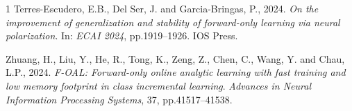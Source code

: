 \documentclass{article}
\begin{document}
\begin{thebibliography}{1}
Terres-Escudero, E.B., Del Ser, J. and Garcia-Bringas, P., 2024. \textit{On the improvement of generalization and stability of forward-only learning via neural polarization}. In: \textit{ECAI 2024}, pp.1919--1926. IOS Press.

Zhuang, H., Liu, Y., He, R., Tong, K., Zeng, Z., Chen, C., Wang, Y. and Chau, L.P., 2024. \textit{F-OAL: Forward-only online analytic learning with fast training and low memory footprint in class incremental learning}. \textit{Advances in Neural Information Processing Systems}, 37, pp.41517--41538.



\end{thebibliography}
\end{document}
